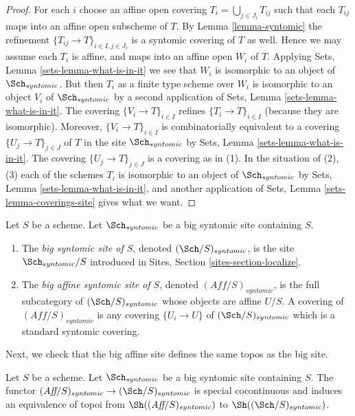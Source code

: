\begin{proof}
For each $i$ choose an affine open covering $T_i = \bigcup_{j \in J_i} T_{ij}$
such that each $T_{ij}$ maps into an affine open subscheme of $T$. By
Lemma \ref{lemma-syntomic}
the refinement $\{T_{ij} \to T\}_{i \in I, j \in J_i}$ is a syntomic covering
of $T$ as well. Hence we may assume each $T_i$ is affine, and maps into
an affine open $W_i$ of $T$. Applying
Sets, Lemma \ref{sets-lemma-what-is-in-it}
we see that $W_i$ is isomorphic to an object of $\Sch_{syntomic}$.
But then $T_i$ as a finite type scheme over $W_i$
is isomorphic to an object $V_i$ of $\Sch_{syntomic}$ by a second
application of
Sets, Lemma \ref{sets-lemma-what-is-in-it}.
The covering $\{V_i \to T\}_{i \in I}$ refines $\{T_i \to T\}_{i \in I}$
(because they are isomorphic).
Moreover, $\{V_i \to T\}_{i \in I}$ is combinatorially equivalent to a
covering $\{U_j \to T\}_{j \in J}$ of $T$ in the site
$\Sch_{syntomic}$ by
Sets, Lemma \ref{sets-lemma-what-is-in-it}.
The covering $\{U_j \to T\}_{j \in J}$ is a covering as in (1).
In the situation of (2), (3) each of the
schemes $T_i$ is isomorphic to an object of $\Sch_{syntomic}$ by
Sets, Lemma \ref{sets-lemma-what-is-in-it},
and another application of
Sets, Lemma \ref{sets-lemma-coverings-site}
gives what we want.
\end{proof}

\begin{definition}
\label{definition-big-small-syntomic}
Let $S$ be a scheme. Let $\Sch_{syntomic}$ be a big syntomic
site containing $S$.
\begin{enumerate}
\item The {\it big syntomic site of $S$}, denoted
$(\Sch/S)_{syntomic}$, is the site $\Sch_{syntomic}/S$
introduced in Sites, Section \ref{sites-section-localize}.
\item The {\it big affine syntomic site of $S$}, denoted
$(\textit{Aff}/S)_{syntomic}$, is the full subcategory of
$(\Sch/S)_{syntomic}$ whose objects are affine $U/S$.
A covering of $(\textit{Aff}/S)_{syntomic}$ is any covering
$\{U_i \to U\}$ of $(\Sch/S)_{syntomic}$ which is a
standard syntomic covering.
\end{enumerate}
\end{definition}

\noindent
Next, we check that the big affine site defines the same
topos as the big site.

\begin{lemma}
\label{lemma-affine-big-site-syntomic}
Let $S$ be a scheme. Let $\Sch_{syntomic}$ be a big syntomic
site containing $S$.
The functor
$(\textit{Aff}/S)_{syntomic} \to (\Sch/S)_{syntomic}$
is special cocontinuous and induces an equivalence of topoi from
$\Sh((\textit{Aff}/S)_{syntomic})$ to
$\Sh((\Sch/S)_{syntomic})$.
\end{lemma}


